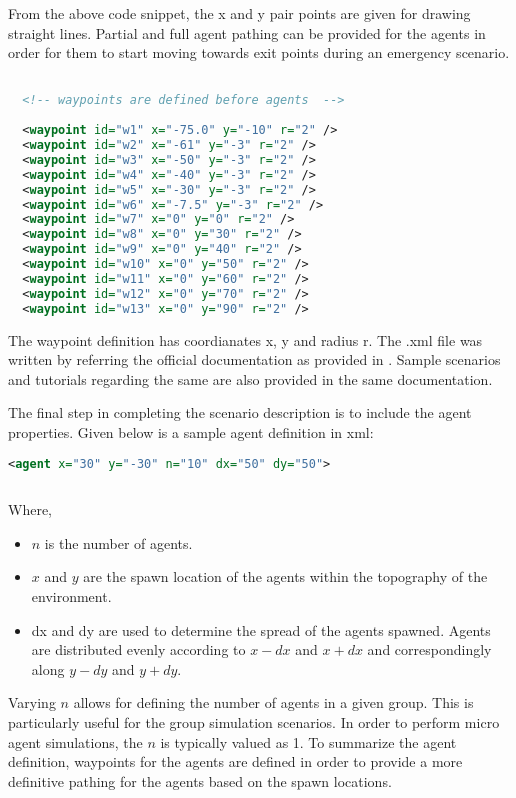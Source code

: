 From the above code snippet, the x and y pair points are given for drawing straight lines.
Partial and full agent pathing can be provided for the agents in order for them to start moving towards exit points during an emergency scenario.

\begin{lstlisting}[language=xml]

  <!-- waypoints are defined before agents  -->
  
  <waypoint id="w1" x="-75.0" y="-10" r="2" />
  <waypoint id="w2" x="-61" y="-3" r="2" />
  <waypoint id="w3" x="-50" y="-3" r="2" />
  <waypoint id="w4" x="-40" y="-3" r="2" />
  <waypoint id="w5" x="-30" y="-3" r="2" />
  <waypoint id="w6" x="-7.5" y="-3" r="2" />
  <waypoint id="w7" x="0" y="0" r="2" />
  <waypoint id="w8" x="0" y="30" r="2" />
  <waypoint id="w9" x="0" y="40" r="2" />
  <waypoint id="w10" x="0" y="50" r="2" />
  <waypoint id="w11" x="0" y="60" r="2" />
  <waypoint id="w12" x="0" y="70" r="2" />
  <waypoint id="w13" x="0" y="90" r="2" />

  \end{lstlisting}

The waypoint definition has coordianates x, y and radius r. The .xml file was written by referring the official documentation as provided in \cite{ref26}. Sample scenarios and tutorials regarding the same are also provided in the same documentation.

The final step in completing the scenario description is to include the agent properties. Given below is a sample agent definition in xml:

\begin{lstlisting}[language=xml]
  <agent x="30" y="-30" n="10" dx="50" dy="50">
  
  \end{lstlisting}

Where,
\begin{itemize}
\item $n$ is the number of agents.
\item $x$ and $y$ are the spawn location of the agents within the topography of the environment.
  \item dx and dy are used to determine the spread of the agents spawned. Agents are distributed evenly according to $x - dx$ and $x + dx$ and correspondingly along $y - dy$ and $y + dy$.
  \end{itemize}

Varying $n$ allows for defining the number of agents in a given group. This is particularly useful for the group simulation scenarios. In order to perform micro agent simulations, the $n$ is typically valued as 1. To summarize the agent definition, waypoints for the agents are defined in order to provide a more definitive pathing for the agents based on the spawn locations.

